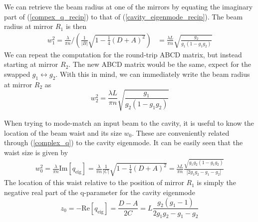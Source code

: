 We can retrieve the beam radius at one of the mirrors by equating the imaginary part of (\ref{compex_q_recip}) to that of (\ref{cavity_eigenmode_recip}). The beam radius at mirror $R_1$ is then
\begin{align} \label{cavity_beamsize_m1}
	w_1^2 = \frac{\lambda}{\pi n} \Big/ \left(\frac{1}{|B|}\sqrt{1 - \frac{1}{4}(D+A)^2}\right)
	&= \frac{\lambda L}{\pi n}\sqrt{\frac{g_2}{g_1(1-g_1g_2)}}
\end{align}
We can repeat the computation for the round-trip ABCD matrix, but instead starting at mirror $R_2$. The new ABCD matrix would be the same, expect for the swapped $g_1 \leftrightarrow g_2$. With this in mind, we can immediately write the beam radius at mirror $R_2$ as
\begin{equation} \label{cavity_beamsize_m2}
	w_2^2 = \frac{\lambda L}{\pi n}\sqrt{\frac{g_1}{g_2(1-g_1g_2)}}
\end{equation}

When trying to mode-match an input beam to the cavity, it is useful to know the location of the beam waist and its size $w_0$. These are conveniently related through (\ref{complex_q}) to the cavity eigenmode. It can be easily seen that the waist size is given by
\begin{align} \label{cavity_w0}
	w_0^2 = \frac{\lambda}{\pi n}\mathrm{Im} \left[q_\mathrm{eig}\right] = \frac{\lambda}{\pi n} \frac{1}{|C|}\sqrt{1-\frac{1}{4}(D+A)^2} = \frac{\lambda L}{\pi n}\frac{\sqrt{g_1 g_2 (1-g_1g_2)}}{\left|2g_1g_2 - g_1 - g_2\right|}
\end{align}
The location of this waist relative to the position of mirror $R_1$ is simply the negative real part of the q-parameter for the cavity eigenmode
\begin{equation} \label{cavity_z0}
	z_0 = -\mathrm{Re}\left[q_\mathrm{eig}\right] = \frac{D-A}{2C} = L\frac{g_2(g_1 - 1)}{2g_1g_2 - g_1 - g_2}
\end{equation}

